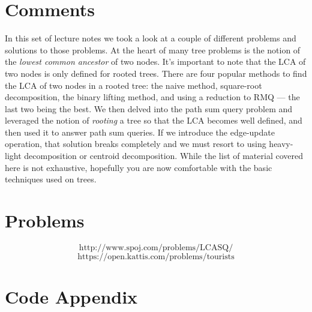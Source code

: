 \documentclass[11pt]{article}
\theoremstyle{plain}
\theoremstyle{definition}
\begin{document}
\section{Comments}
In this set of lecture notes we took a look at a couple of different problems and solutions to those problems. At the heart of many tree problems is the notion of the \emph{lowest common ancestor} of two nodes. It's important to note that the LCA of two nodes is only defined for rooted trees. There are four popular methods to find the LCA of two nodes in a rooted tree: the naive method, square-root decomposition, the binary lifting method, and using a reduction to RMQ --- the last two being the best. We then delved into the path sum query problem and leveraged the notion of \emph{rooting} a tree so that the LCA becomes well defined, and then used it to answer path sum queries. If we introduce the edge-update operation, that solution breaks completely and we must resort to using heavy-light decomposition or centroid decomposition. While the list of material covered here is not exhaustive, hopefully you are now comfortable with the basic techniques used on trees.
\section{Problems}
$$\boxed{\text{http://www.spoj.com/problems/LCASQ/}}$$
$$\boxed{\text{https://open.kattis.com/problems/tourists}}$$
\section*{Code Appendix}
\end{document}
